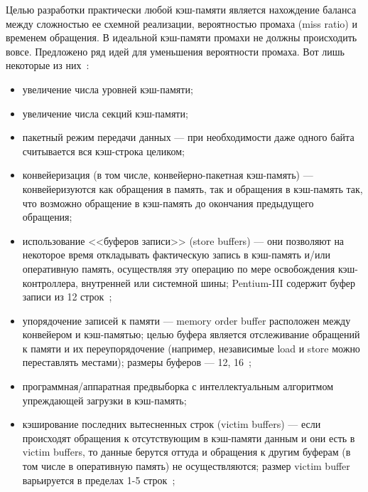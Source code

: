 
Целью разработки практически любой кэш-памяти является нахождение баланса между сложностью ее схемной реализации, вероятностью промаха (miss ratio) и временем обращения. В идеальной кэш-памяти промахи не должны происходить вовсе. Предложено ряд идей для уменьшения вероятности промаха. Вот лишь некоторые из них~\cite{Kasperski_EffectiveMemory}:
\begin{itemize}
	\item увеличение числа уровней кэш-памяти;
	\item увеличение числа секций кэш-памяти;
	\item пакетный режим передачи данных --- при необходимости даже одного байта считывается вся кэш-строка целиком;
	\item конвейеризация (в том числе, конвейерно-пакетная кэш-память) --- конвейеризуются как обращения в память, так и обращения в кэш-память так, что возможно обращение в кэш-память до окончания предыдущего обращения;
	\item использование <<буферов записи>> (store buffers) --- они позволяют на некоторое время откладывать фактическую запись в кэш-память и/или оперативную память, осуществляя эту операцию по мере освобождения кэш-контроллера, внутренней или системной шины; Pentium-III содержит буфер записи из 12 строк~\cite{Kasperski_EffectiveMemory};


	\item упорядочение записей к памяти --- memory order buffer расположен между конвейером и кэш-памятью; целью буфера является отслеживание обращений к памяти и их переупорядочение (например, независимые load и store можно переставлять местами); размеры буферов --- 12, 16~\cite{MOBs};
	\item программная/аппаратная предвыборка с интеллектуальным алгоритмом упреждающей загрузки в кэш-память;
	\item кэширование последних вытесненных строк (victim buffers) --- если происходят обращения к отсутствующим в кэш-памяти данным и они есть в victim buffers, то данные берутся оттуда и обращения к другим буферам (в том числе в оперативную память) не осуществляются; размер victim buffer варьируется в пределах 1-5 строк~\cite{HennesyPatterson};

\end{itemize}

